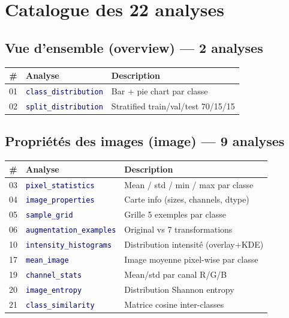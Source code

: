\documentclass[11pt,a4paper,oneside]{report}
\newcommand{\code}[1]{\texttt{\textcolor{navy}{#1}}}
\begin{document}
\section{Catalogue des 22 analyses}

\subsection{Vue d'ensemble (overview) — 2 analyses}

\begin{table}[!htbp]
\centering
\begin{tabularx}{\textwidth}{|c|l|X|}
\hline
\textbf{\#} & \textbf{Analyse} & \textbf{Description} \\
\hline
01 & \code{class\_distribution} & Bar + pie chart par classe \\
02 & \code{split\_distribution} & Stratified train/val/test 70/15/15 \\
\hline
\end{tabularx}
\end{table}

\subsection{Propriétés des images (image) — 9 analyses}

\begin{table}[!htbp]
\centering
\begin{tabularx}{\textwidth}{|c|l|X|}
\hline
\textbf{\#} & \textbf{Analyse} & \textbf{Description} \\
\hline
03 & \code{pixel\_statistics} & Mean / std / min / max par classe \\
04 & \code{image\_properties} & Carte info (sizes, channels, dtype) \\
05 & \code{sample\_grid} & Grille 5 exemples par classe \\
06 & \code{augmentation\_examples} & Original vs 7 transformations \\
10 & \code{intensity\_histograms} & Distribution intensité (overlay+KDE) \\
17 & \code{mean\_image} & Image moyenne pixel-wise par classe \\
19 & \code{channel\_stats} & Mean/std par canal R/G/B \\
20 & \code{image\_entropy} & Distribution Shannon entropy \\
21 & \code{class\_similarity} & Matrice cosine inter-classes \\
\hline
\end{tabularx}
\end{table}
\end{document}
